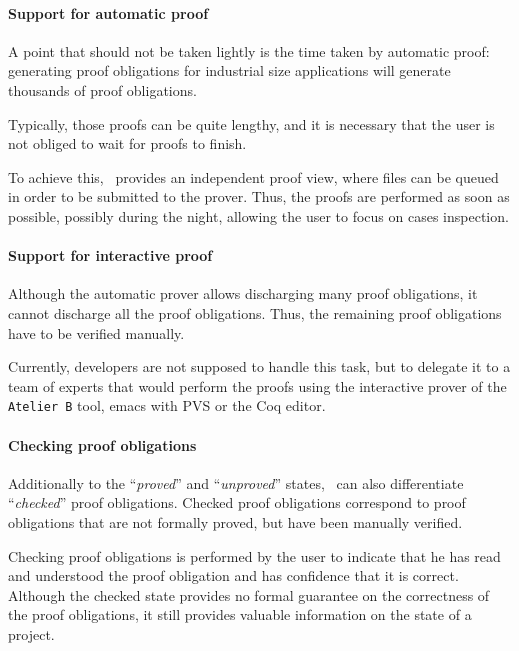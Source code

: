\paragraph{Support for automatic proof}
\label{Support for automatic proof}
 A point that should not be taken lightly is the time taken by
automatic proof: generating proof obligations for industrial size
applications will generate thousands of proof obligations.

Typically, those proofs can be quite lengthy, and it is necessary that
the user is not obliged to wait for proofs to finish.

To achieve this, \JACK\ provides an independent proof view, where
files can be queued in order to be submitted to the prover. Thus, the
proofs are performed as soon as possible, possibly during the night,
allowing the user to focus on cases inspection.

\paragraph{Support for interactive proof}
Although the automatic prover allows discharging many proof
obligations, it cannot discharge all the proof obligations. Thus, the
remaining proof obligations have to be verified manually.

Currently, developers are not supposed to handle this task, but to
delegate it to a team of experts that would perform the proofs using
the interactive prover of the \texttt{Atelier B} tool, emacs with PVS
or the Coq editor.


\paragraph{Checking proof obligations}
Additionally to the ``\textit{proved}'' and ``\textit{unproved}''
states, \JACK\ can also differentiate ``\textit{checked}'' proof
obligations. Checked proof obligations correspond to proof obligations
that are not formally proved, but have been manually verified.

Checking proof obligations is performed by the user to indicate that
he has read and understood the proof obligation and has confidence
that it is correct. Although the checked state provides no formal
guarantee on the correctness of the proof obligations, it still
provides valuable information on the state of a project.

